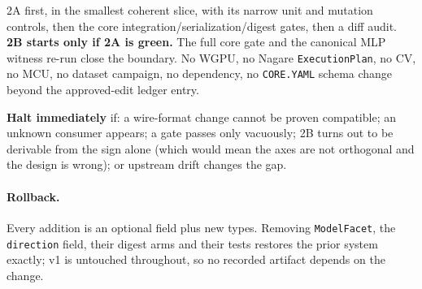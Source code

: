 \documentclass[11pt,a4paper]{article}
\begin{document}
2A first, in the smallest coherent slice, with its narrow unit and mutation controls, then the core
integration/serialization/digest gates, then a diff audit. \textbf{2B starts only if 2A is green.}
The full core gate and the canonical MLP witness re-run close the boundary. No WGPU, no Nagare
\texttt{ExecutionPlan}, no CV, no MCU, no dataset campaign, no dependency, no \texttt{CORE.YAML}
schema change beyond the approved-edit ledger entry.

\textbf{Halt immediately} if: a wire-format change cannot be proven compatible; an unknown consumer
appears; a gate passes only vacuously; 2B turns out to be derivable from the sign alone (which would
mean the axes are not orthogonal and the design is wrong); or upstream drift changes the gap.

\paragraph{Rollback.} Every addition is an optional field plus new types. Removing
\texttt{ModelFacet}, the \texttt{direction} field, their digest arms and their tests restores the
prior system exactly; v1 is untouched throughout, so no recorded artifact depends on the change.
\end{document}

